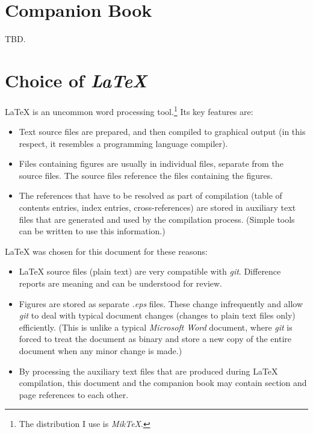 \section{Companion Book}
\label{ciov2:scbk0}

TBD.

\section{Choice of \emph{\LaTeX{}}}
\label{ciov2:sclt0}

\LaTeX{} is an uncommon word processing tool.\footnote{The distribution I use is
\emph{MikTeX}.}  Its key features are:

\begin{itemize}
   \item Text source files are prepared, and then compiled to graphical output (in this respect,
         it resembles a programming language compiler).
   \item Files containing figures are usually in individual files, separate from the source
         files.  The source files reference the files containing the figures.
   \item The references that have to be resolved as part of compilation (table of contents
         entries, index entries, cross-references) are stored in auxiliary text files that are
         generated and
         used by the compilation process.  (Simple tools can be written
         to use this information.)
\end{itemize}

\LaTeX{} was chosen for this document for these reasons:

\begin{itemize}
   \item \LaTeX{} source files (plain text) are very compatible with \emph{git}.
         Difference reports are meaning and can be understood for review.
   \item Figures are stored as separate \emph{.eps} files.
         These change infrequently and allow \emph{git} to deal with typical document changes
         (changes to plain text files only) efficiently.  (This is unlike a typical
         \emph{Microsoft Word} document, where
         \emph{git} is forced to treat the document as binary and store a new copy of the entire
         document when any minor change is made.)
   \item By processing the auxiliary text files that are produced during 
         \LaTeX{} compilation, this document and the companion book may contain section
         and page references to each other.
\end{itemize}

